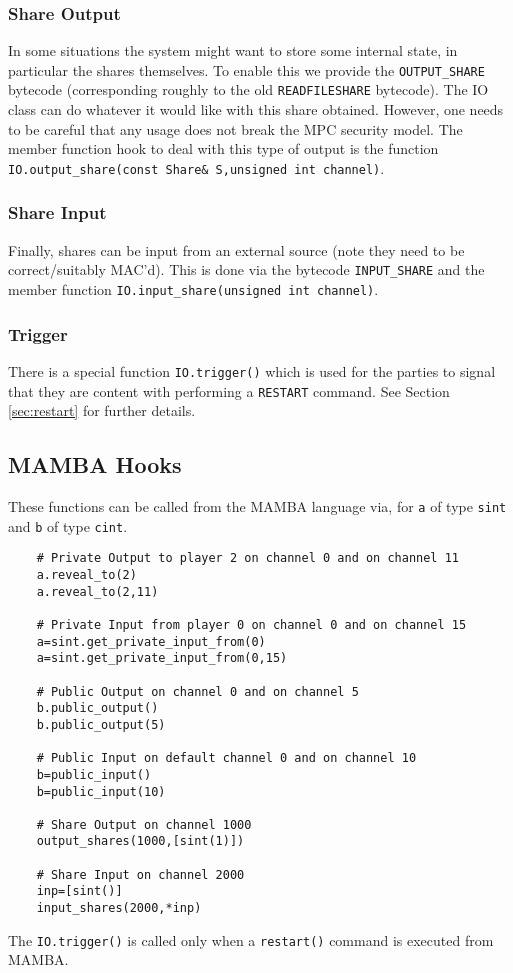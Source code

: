 \subsubsection{Share Output}
In some situations the system might want to store some
internal state, in particular the shares themselves.
To enable this we provide the \verb+OUTPUT_SHARE+
bytecode (corresponding roughly to the old 
\verb+READFILESHARE+ bytecode). The IO class can do
whatever it would like with this share obtained. However,
one needs to be careful that any usage does not break the
MPC security model.
The member function hook to deal with this type of
output is the function
\verb+IO.output_share(const Share& S,unsigned int channel)+.

\subsubsection{Share Input}
Finally, shares can be input from an external source
(note they need to be correct/suitably MAC'd). This
is done via the bytecode \verb+INPUT_SHARE+ and the
member function \verb+IO.input_share(unsigned int channel)+.

\subsubsection{Trigger}
There is a special function \verb+IO.trigger()+ which is
used for the parties to signal that they are content with
performing a \verb+RESTART+ command.
See Section \ref{sec:restart} for further details.


\subsection{MAMBA Hooks}
These functions can be called from the MAMBA language via,
for \verb+a+ of type \verb+sint+ and \verb+b+ of type \verb+cint+.
\begin{verbatim}
    # Private Output to player 2 on channel 0 and on channel 11
    a.reveal_to(2)
    a.reveal_to(2,11)

    # Private Input from player 0 on channel 0 and on channel 15
    a=sint.get_private_input_from(0)
    a=sint.get_private_input_from(0,15)

    # Public Output on channel 0 and on channel 5
    b.public_output()
    b.public_output(5)

    # Public Input on default channel 0 and on channel 10
    b=public_input()
    b=public_input(10)

    # Share Output on channel 1000
    output_shares(1000,[sint(1)])

    # Share Input on channel 2000
    inp=[sint()]
    input_shares(2000,*inp)
\end{verbatim}
The \verb+IO.trigger()+ is called only when a \verb+restart()+ command
is executed from MAMBA.

